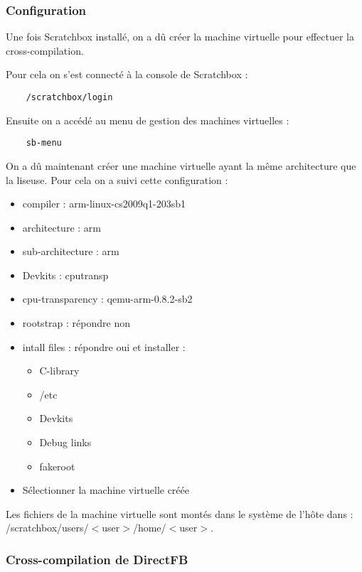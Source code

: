 \subsubsection{Configuration}

Une fois Scratchbox installé, on a dû créer la machine virtuelle pour effectuer la cross-compilation.

Pour cela on s'est connecté à la console de Scratchbox : 
\begin{lstlisting}
	/scratchbox/login
\end{lstlisting}
Ensuite on a accédé au menu de gestion des machines virtuelles : 
\begin{lstlisting}
	sb-menu
\end{lstlisting}
On a dû maintenant créer une machine virtuelle ayant la même architecture que la liseuse. 
Pour cela on a suivi cette configuration : 
\begin{itemize}
\renewcommand{\labelitemi}{$\bullet$}
	\item compiler : arm-linux-cs2009q1-203sb1
	\item architecture : arm
	\item sub-architecture : arm
	\item Devkits : cputransp
	\item cpu-transparency :  qemu-arm-0.8.2-sb2
	\item rootstrap : répondre non
	\item intall files : répondre oui et installer :
		\begin{itemize}
			\item C-library
			\item /etc
			\item Devkits 
			\item Debug links
			\item fakeroot
		\end{itemize}
	\item Sélectionner la machine virtuelle créée
\end{itemize}

Les fichiers de la machine virtuelle sont montés dans le système de l'hôte dans : 
/scratchbox/users/$<$user$>$/home/$<$user$>$.

\newpage

\subsubsection{Cross-compilation de DirectFB}

